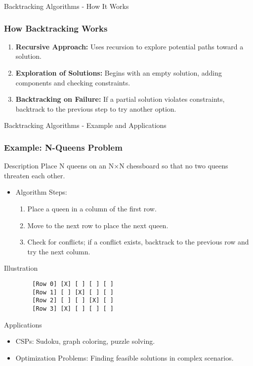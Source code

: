\documentclass[aspectratio=169]{beamer}
\begin{document}
\begin{frame}[fragile]{Backtracking Algorithms - How It Works}
    \frametitle{How Backtracking Works}
    \begin{enumerate}
        \item \textbf{Recursive Approach:} Uses recursion to explore potential paths toward a solution.
        \item \textbf{Exploration of Solutions:} Begins with an empty solution, adding components and checking constraints.
        \item \textbf{Backtracking on Failure:} If a partial solution violates constraints, backtrack to the previous step to try another option.
    \end{enumerate}
\end{frame}

\begin{frame}[fragile]{Backtracking Algorithms - Example and Applications}
    \frametitle{Example: N-Queens Problem}
    \begin{block}{Description}
        Place N queens on an N×N chessboard so that no two queens threaten each other.
    \end{block}
    
    \begin{itemize}
        \item Algorithm Steps:
        \begin{enumerate}
            \item Place a queen in a column of the first row.
            \item Move to the next row to place the next queen.
            \item Check for conflicts; if a conflict exists, backtrack to the previous row and try the next column.
        \end{enumerate}
    \end{itemize}

    \begin{block}{Illustration}
        \begin{verbatim}
        [Row 0] [X] [ ] [ ] [ ]
        [Row 1] [ ] [X] [ ] [ ]
        [Row 2] [ ] [ ] [X] [ ]
        [Row 3] [X] [ ] [ ] [ ]
        \end{verbatim}
    \end{block}
    
    \begin{block}{Applications}
        \begin{itemize}
            \item CSPs: Sudoku, graph coloring, puzzle solving.
            \item Optimization Problems: Finding feasible solutions in complex scenarios.
        \end{itemize}
    \end{block}
\end{frame}
\end{document}
